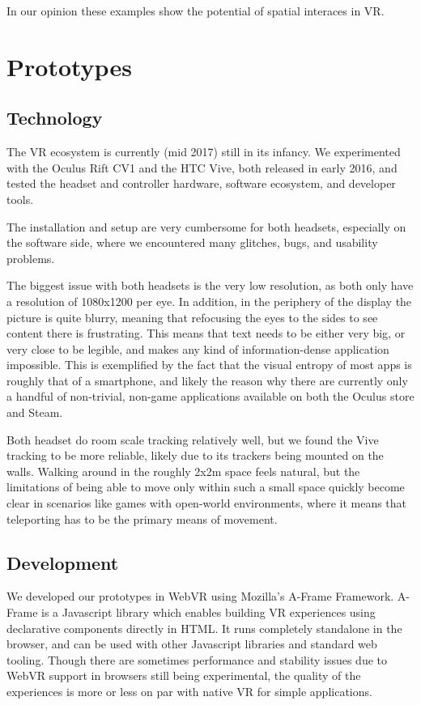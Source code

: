 \documentclass{tufte-book} %
\begin{document}
In our opinion these examples show the potential of spatial interaces in VR.


\chapter{Prototypes}
\label{ch:prototypes}

\section{Technology}
The \textsc{VR} ecosystem is currently (mid 2017) still in its infancy. We experimented with the Oculus Rift \textsc{CV1} and the \textsc{HTC} Vive, both released in early 2016, and tested the headset and controller hardware, software ecosystem, and developer tools.

The installation and setup are very cumbersome for both headsets, especially on the software side, where we encountered many glitches, bugs, and usability problems.

The biggest issue with both headsets is the very low resolution, as both only have a resolution of 1080x1200 per eye. In addition, in the periphery of the display the picture is quite blurry, meaning that refocusing the eyes to the sides to see content there is frustrating. This means that text needs to be either very big, or very close to be legible, and makes any kind of information-dense application impossible. This is exemplified by the fact that the visual entropy of most apps is roughly that of a smartphone, and likely the reason why there are currently only a handful of non-trivial, non-game applications available on both the Oculus store and Steam.

Both headset do room scale tracking relatively well, but we found the Vive tracking to be more reliable, likely due to its trackers being mounted on the walls. Walking around in the roughly 2x2m space feels natural, but the limitations of being able to move only within such a small space quickly become clear in scenarios like games with open-world environments, where it means that teleporting has to be the primary means of movement.

\section{Development}
We developed our prototypes in WebVR using Mozilla's A-Frame Framework. A-Frame is a Javascript library which enables building VR experiences using declarative components directly in HTML. It runs completely standalone in the browser, and can be used with other Javascript libraries and standard web tooling. Though there are sometimes performance and stability issues due to WebVR support in browsers still being experimental, the quality of the experiences is more or less on par with native VR for simple applications.
\end{document}
